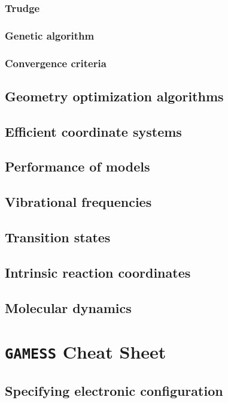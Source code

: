 \documentclass[11pt]{article}
\begin{document}
\subsubsection{Trudge}
\label{sec:orgaab122a}
\subsubsection{Genetic algorithm}
\label{sec:org107d37f}
\subsubsection{Convergence criteria}
\label{sec:orgb1178c7}

\subsection{Geometry optimization algorithms}
\label{sec:org2804fe3}

\subsection{Efficient coordinate systems}
\label{sec:org6718d1c}
\subsection{Performance of models}
\label{sec:orgc2f4384}
\subsection{Vibrational frequencies}
\label{sec:org7a400a1}
\subsection{Transition states}
\label{sec:org71ae6c4}
\subsection{Intrinsic reaction coordinates}
\label{sec:org5cdaa10}
\newpage

\subsection{Molecular dynamics}
\label{sec:orge913b2a}

\section{\texttt{GAMESS} Cheat Sheet}
\label{sec:orgd1efae6}
\subsection{Specifying electronic configuration}
\label{sec:orga49a924}
\end{document}
